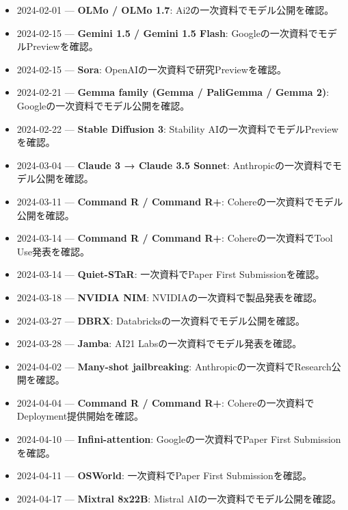 \begin{itemize}[leftmargin=1.5em,itemsep=0.25em]
\item 2024-02-01 — \textbf{OLMo / OLMo 1.7}: Ai2の一次資料でモデル公開を確認。 \autocite{src-3d2fa83e273d}
\item 2024-02-15 — \textbf{Gemini 1.5 / Gemini 1.5 Flash}: Googleの一次資料でモデルPreviewを確認。 \autocite{src-28ee6f0f00f4}
\item 2024-02-15 — \textbf{Sora}: OpenAIの一次資料で研究Previewを確認。 \autocite{src-0fe343211040}
\item 2024-02-21 — \textbf{Gemma family (Gemma / PaliGemma / Gemma 2)}: Googleの一次資料でモデル公開を確認。 \autocite{src-0395647db4a8}
\item 2024-02-22 — \textbf{Stable Diffusion 3}: Stability AIの一次資料でモデルPreviewを確認。 \autocite{src-7b3484ead314}
\item 2024-03-04 — \textbf{Claude 3 → Claude 3.5 Sonnet}: Anthropicの一次資料でモデル公開を確認。 \autocite{src-e91e6f80eaac}
\item 2024-03-11 — \textbf{Command R / Command R+}: Cohereの一次資料でモデル公開を確認。 \autocite{src-77e35e5f22be}
\item 2024-03-14 — \textbf{Command R / Command R+}: Cohereの一次資料でTool Use発表を確認。 \autocite{src-77e35e5f22be}
\item 2024-03-14 — \textbf{Quiet-STaR}: 一次資料でPaper First Submissionを確認。 \autocite{src-12fa04e64d24}
\item 2024-03-18 — \textbf{NVIDIA NIM}: NVIDIAの一次資料で製品発表を確認。 \autocite{src-054d1f81750b}
\item 2024-03-27 — \textbf{DBRX}: Databricksの一次資料でモデル公開を確認。 \autocite{src-ff36b1c2ef30}
\item 2024-03-28 — \textbf{Jamba}: AI21 Labsの一次資料でモデル発表を確認。 \autocite{src-b5fbfc0d43e4}
\item 2024-04-02 — \textbf{Many-shot jailbreaking}: Anthropicの一次資料でResearch公開を確認。 \autocite{src-018fb3abd44d}
\item 2024-04-04 — \textbf{Command R / Command R+}: Cohereの一次資料でDeployment提供開始を確認。 \autocite{src-77e35e5f22be}
\item 2024-04-10 — \textbf{Infini-attention}: Googleの一次資料でPaper First Submissionを確認。 \autocite{src-2eb2353f0533}
\item 2024-04-11 — \textbf{OSWorld}: 一次資料でPaper First Submissionを確認。 \autocite{src-70b5d4b3bedd}
\item 2024-04-17 — \textbf{Mixtral 8x22B}: Mistral AIの一次資料でモデル公開を確認。 \autocite{src-05f98c47f3e8}

\end{itemize}
